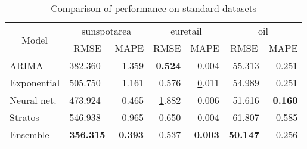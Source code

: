 \begin{table}[]
\centering
\caption{Comparison of performance on standard datasets}
\begin{tabular}{|l|l|r|r|r|r|r|}
\hline
\multicolumn{1}{|c|}{\multirow{2}{*}{Model}} & \multicolumn{2}{c|}{sunspotarea}                                  & \multicolumn{2}{c|}{euretail}                                        & \multicolumn{2}{c|}{oil}                                              \\ \cline{2-7} 
\multicolumn{1}{|c|}{}                       & \multicolumn{1}{c|}{RMSE} & \multicolumn{1}{c|}{MAPE}             & \multicolumn{1}{c|}{RMSE}    & \multicolumn{1}{c|}{MAPE}             & \multicolumn{1}{c|}{RMSE}              & \multicolumn{1}{c|}{MAPE}    \\ \hline
ARIMA                                        & 382.360                 & {\ul 1.359}                         & \textbf{0.524}             & 0.004                               & 55.313                               & 0.251                      \\ \hline
Exponential                                  & 505.750                 & 1.161                               & 0.576                      & {\ul 0.011}                         & 54.989                               & 0.251                      \\ \hline
Neural net.                                  & 473.924                 & 0.465                               & {\ul 1.882}                & 0.006                               & 51.616                               & \textbf{0.160}             \\ \hline
Stratos                                      & {\ul 546.938}           & 0.965                               & 0.650                      & 0.004                               & {\ul 61.807}                         & {\ul 0.585}                \\ \hline
Ensemble                                     & \textbf{356.315}        & \textbf{0.393} & 0.537 & \textbf{0.003} & \textbf{50.147} & 0.256 \\ \hline
\end{tabular}
\end{table}


